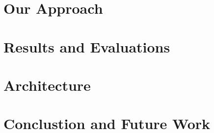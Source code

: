 \documentclass[12pt,twoside]{report}
\begin{document}
% 



% 

\chapter{Our Approach}


\chapter{Results and Evaluations}


\chapter{Architecture}


\chapter{Conclustion and Future Work}



\end{document}
